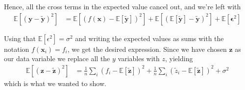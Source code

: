\documentclass[reprint,english,notitlepage,aps,nobalancelastpage,nofootinbib]{revtex4-1}  %
\newcommand{\expy}{\mathbb{E}[\mathbf{\tilde{y}}]}
\newcommand{\expz}{\mathbb{E}[\mathbf{\tilde{z}}]}
\newcommand{\closed}[1]{\left({#1}\right)}
\newcommand{\bracket}[1]{\left[{#1}\right]}
\begin{document}
Hence, all the cross terms in the expected value cancel out, and we're left with
\begin{align*}
  \mathbb{E}\left[(\mathbf{y} - \mathbf{\tilde{y}})^2\right] &= \mathbb{E}\bracket{\closed{f(\mathbf{x})-\expy}^2} + \mathbb{E}\bracket{\closed{\expy - \mathbf{\tilde{y}}}^2} + \mathbb{E}\bracket{\bm{\epsilon}^2}
\end{align*}

Using that $\mathbb{E}[\epsilon^2]=\sigma^2$ and writing the expected values as sums with the notation $f(\mathbf{x}_i)=f_i$, we get the desired expression. Since we have chosen $\mathbf{z}$ as our data variable we replace all the $y$ variables with $z$, yielding
\begin{align}
  \mathbb{E}\left[(\mathbf{z} - \mathbf{\tilde{z}})^2\right] &= \frac{1}{n} \sum_i (f_i - \expz)^2 + \frac{1}{n}\sum_i (\tilde{z}_i - \expz )^2 + \sigma^2
\end{align}
which is what we wanted to show.
\end{document}
